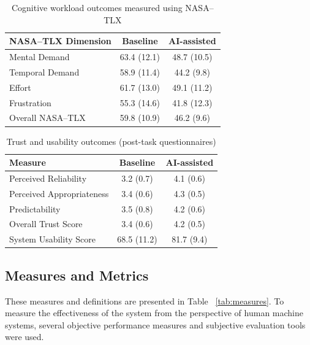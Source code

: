 \documentclass[journal]{IEEEtran}
\theoremstyle{plain}
\theoremstyle{definition}
\begin{document}
    \begin{table}[t]
        \caption{Cognitive workload outcomes measured using NASA--TLX}
        \label{tab:workload}
        \centering
        \begin{tabular}{lcc}
            \toprule
            \textbf{NASA--TLX Dimension} & \textbf{Baseline} & \textbf{AI-assisted} \\
            \midrule
            Mental Demand & 63.4 (12.1) & 48.7 (10.5) \\
            Temporal Demand & 58.9 (11.4) & 44.2 (9.8) \\
            Effort & 61.7 (13.0) & 49.1 (11.2) \\
            Frustration & 55.3 (14.6) & 41.8 (12.3) \\
            \midrule
            Overall NASA--TLX & 59.8 (10.9) & 46.2 (9.6) \\
            \bottomrule
        \end{tabular}
    \end{table}

    \begin{table}[t]
        \caption{Trust and usability outcomes (post-task questionnaires)}
        \label{tab:trust_usability}
        \centering
        \begin{tabular}{lcc}
            \toprule
            \textbf{Measure} & \textbf{Baseline} & \textbf{AI-assisted} \\
            \midrule
            Perceived Reliability & 3.2 (0.7) & 4.1 (0.6) \\
            Perceived Appropriateness & 3.4 (0.6) & 4.3 (0.5) \\
            Predictability & 3.5 (0.8) & 4.2 (0.6) \\
            \midrule
            Overall Trust Score & 3.4 (0.6) & 4.2 (0.5) \\
            System Usability Score & 68.5 (11.2) & 81.7 (9.4) \\
            \bottomrule
        \end{tabular}
    \end{table}

    \subsection{Measures and Metrics}
    These measures and definitions are presented in Table ~\ref{tab:measures}.
    To measure the effectiveness of the system from the perspective of human machine systems, several objective performance measures and subjective evaluation tools were used.
\end{document}

